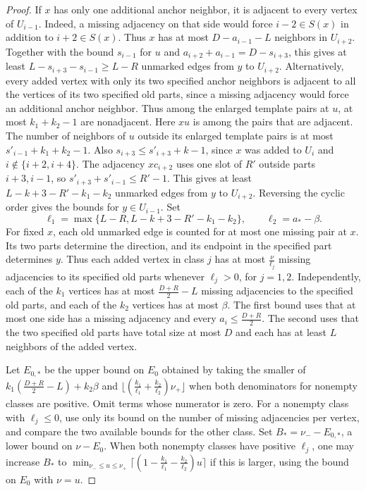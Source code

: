\documentclass[preprint,11pt,numbers]{elsarticle-arxiv}
\numberwithin{equation}{section}
\theoremstyle{definition}
\begin{document}
\begin{proof}
If $x$ has only one additional anchor neighbor, it is adjacent
to every vertex of $U_{i-1}$. Indeed, a missing adjacency on
that side would force $i-2\in S(x)$ in addition to
$i+2\in S(x)$. Thus $x$ has at most $D-a_{i-1}-L$ neighbors
in $U_{i+2}$. Together with the bound $s_{i-1}$ for $u$ and
$a_{i+2}+a_{i-1}=D-s_{i+3}$, this gives at least
$L-s_{i+3}-s_{i-1}\geq L-R$ unmarked edges from $y$ to
$U_{i+2}$. Alternatively, every added vertex with only its two
specified anchor neighbors is adjacent to all the vertices of
its two specified old parts, since a missing adjacency would
force an additional anchor neighbor. Thus among the enlarged
template pairs at $u$, at most $k_1+k_2-1$ are nonadjacent.
Here $xu$ is among the pairs that are adjacent. The number
of neighbors of $u$ outside its enlarged template pairs is
at most $s'_{i-1}+k_1+k_2-1$. Also
$s_{i+3}\leq s'_{i+3}+k-1$, since $x$ was added to $U_i$
and $i\notin\{i+2,i+4\}$. The adjacency $xc_{i+2}$ uses
one slot of $R'$ outside parts $i+3,i-1$, so
$s'_{i+3}+s'_{i-1}\leq R'-1$. This gives at least
$L-k+3-R'-k_1-k_2$ unmarked edges from $y$ to $U_{i+2}$.
Reversing the cyclic order gives the bounds for $y\in U_{i-1}$.
Set
\[
 \ell_1=\max\{L-R,L-k+3-R'-k_1-k_2\},\qquad \ell_2=a_*-\beta.
\]
For fixed $x$, each old unmarked edge is counted for at most one
missing pair at $x$. Its two parts determine the direction, and
its endpoint in the specified part determines $y$. Thus each
added vertex in class $j$ has at most $\frac{\nu}{\ell_j}$
missing adjacencies to its specified old parts whenever
$\ell_j>0$, for $j=1,2$. Independently, each of the $k_1$ vertices
has at most $\frac{D+R}{2}-L$ missing adjacencies to the
specified old parts, and each of the $k_2$ vertices has at most
$\beta$. The first bound uses that at most one side has a missing
adjacency and every $a_i\leq\frac{D+R}{2}$. The second uses that
the two specified old parts have total size at most $D$ and
each has at least $L$ neighbors of the added vertex.

Let $E_{0,*}$ be the upper bound on $E_0$ obtained by taking the
smaller of $k_1(\frac{D+R}{2}-L)+k_2\beta$ and
$\lfloor(\frac{k_1}{\ell_1}+\frac{k_2}{\ell_2})\nu_+\rfloor$
when both denominators for nonempty classes are positive.
Omit terms whose numerator is zero. For a nonempty class with
$\ell_j\leq0$, use only its bound on the number of missing
adjacencies per vertex, and compare the two available bounds for
the other class. Set $B_*=\nu_--E_{0,*}$, a lower bound on
$\nu-E_0$. When both nonempty classes have positive $\ell_j$,
one may increase $B_*$ to
$\min_{\nu_-\leq u\leq\nu_+}\bigl\lceil
(1-\frac{k_1}{\ell_1}-\frac{k_2}{\ell_2})u\bigr\rceil$
if this is larger, using the bound on $E_0$ with $\nu=u$.


\end{proof}
\end{document}
